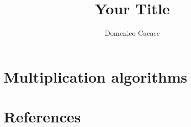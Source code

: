 \documentclass[a4paper,10pt]{book}
\title{Your Title}
\author{Domenico Cacace}
\begin{document}
\maketitle
\tableofcontents

\chapter{Multiplication algorithms}




\chapter*{References}

\end{document}
